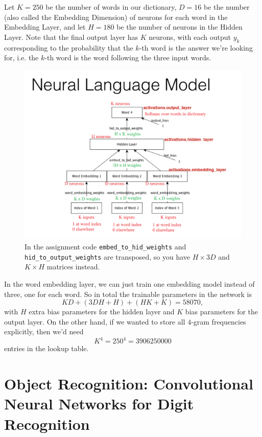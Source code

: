 \documentclass[12pt]{article}
\theoremstyle{plain}
\theoremstyle{definition}
\theoremstyle{remark}
\begin{document}
Let $K = 250$ be the number of words in our dictionary, $D = 16$ be the number (also called the Embedding Dimension) of neurons for each word in the Embedding Layer, and let $H = 180$ be the number of neurons in the Hidden Layer. Note that the final output layer has $K$ neurons, with each output $y_k$ corresponding to the probability that the $k$-th word is the answer we're looking for, i.e. the $k$-th word is the word following the three input words.

\begin{figure}[H]
\centering
\includegraphics[width=1.0\textwidth]{neuralnetlanguagemodel}
\caption{In the assignment code \lstinline|embed_to_hid_weights| and \lstinline|hid_to_output_weights| are transposed, so you have $H \times 3D$ and $K \times H$ matrices instead.}
\end{figure}

In the word embedding layer, we can just train one embedding model instead of three, one for each word. So in total the trainable parameters in the network is $$KD + (3DH + H) + (HK + K) = 58070,$$ with $H$ extra bias parameters for the hidden layer and $K$ bias parameters for the output layer. On the other hand, if we wanted to store all $4$-gram frequencies explicitly, then we'd need $$K^4 = 250^4 = 3906250000$$ entries in the lookup table.

\part{Object Recognition: Convolutional Neural Networks for Digit Recognition}
\end{document}
